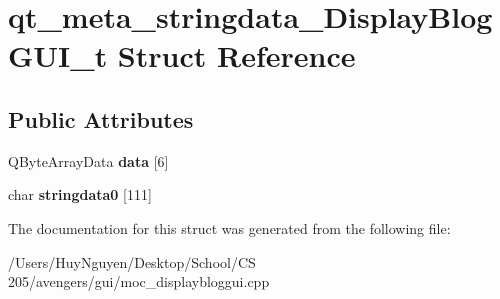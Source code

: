 \hypertarget{structqt__meta__stringdata__DisplayBlogGUI__t}{}\section{qt\+\_\+meta\+\_\+stringdata\+\_\+\+Display\+Blog\+G\+U\+I\+\_\+t Struct Reference}
\label{structqt__meta__stringdata__DisplayBlogGUI__t}
\subsection*{Public Attributes}
\begin{DoxyCompactItemize}
\item 
Q\+Byte\+Array\+Data {\bfseries data} \mbox{[}6\mbox{]}\hypertarget{structqt__meta__stringdata__DisplayBlogGUI__t_a529aaa2cfe82139a9be8d8e0ca102583}{}\label{structqt__meta__stringdata__DisplayBlogGUI__t_a529aaa2cfe82139a9be8d8e0ca102583}

\item 
char {\bfseries stringdata0} \mbox{[}111\mbox{]}\hypertarget{structqt__meta__stringdata__DisplayBlogGUI__t_afaf3d1b2e860451f9232bdf5a546aab6}{}\label{structqt__meta__stringdata__DisplayBlogGUI__t_afaf3d1b2e860451f9232bdf5a546aab6}

\end{DoxyCompactItemize}


The documentation for this struct was generated from the following file\+:\begin{DoxyCompactItemize}
\item 
/\+Users/\+Huy\+Nguyen/\+Desktop/\+School/\+C\+S 205/avengers/gui/moc\+\_\+displaybloggui.\+cpp\end{DoxyCompactItemize}
